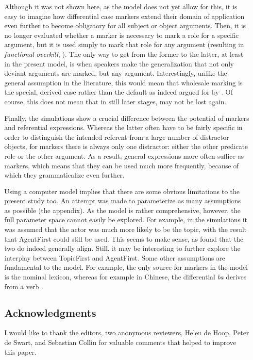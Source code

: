 \documentclass[output=paper]{LSP/langsci}
\begin{document}
Although it was not shown here, as the model does not yet allow for this, it is easy to imagine how differential case markers extend their domain of application even further to become obligatory for all subject or object arguments. Then, it is no longer evaluated whether a marker is necessary to mark a role for a specific argument, but it is used simply to mark that role for any argument (resulting in \textit{functional overkill}, \cf \citealt{Durie1995Towards}). The only way to get from the former to the latter, at least in the present model, is when speakers make the generalization that not only deviant arguments are marked, but any argument. Interestingly, unlike the general assumption in the literature, this would mean that wholesale marking is the special, derived case rather than the default as indeed argued for by \citet{Sinnemki2014Typological}. Of course, this does not mean that in still later stages,  may not be lost again.

\newpage
Finally, the simulations show a crucial difference between the  potential of markers and referential expressions. Whereas the latter often have to be fairly specific in order to distinguish the intended referent from a large number of distractor objects, for markers there is always only one distractor: either the other predicate role or the other argument. As a result, general expressions more often suffice as markers, which means that they can be used much more frequently, because of which they grammaticalize even further.

Using a computer model implies that there are some obvious limitations to the present study too. An attempt was made to parameterize as many assumptions as possible (\cf the appendix). As the model is rather comprehensive, however, the full parameter space cannot easily be explored. For example, in the simulations it was assumed that the actor was much more likely to be the topic, with the result that AgentFirst could still be used. This seems to make sense, as \cite{Comrie1989Language} found that the two do indeed generally align. Still, it may be interesting to further explore the interplay between TopicFirst and AgentFirst. Some other assumptions are fundamental to the model. For example, the only source for markers in the model is the nominal lexicon, whereas for example in Chinese, the differential  \textit{ba} derives from a verb \citep[22]{Yang2008Indefinite}.


\subsection*{Acknowledgments}
I would like to thank the editors, two anonymous reviewers, Helen de Hoop, Peter de Swart, and Sebastian Collin for valuable comments that helped to improve this paper. 
\end{document}

